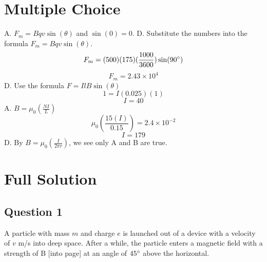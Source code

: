 \documentclass[letter,12pt]{exam}
\begin{document}
\begin{center}
\end{center}

\section{Multiple Choice}

\begin{questions}
	\question A. $F_m=Bqv\sin(\theta)$ and $\sin(0)=0$.
	\question D. Substitute the numbers into the formula $F_m=Bqv\sin(\theta)$.
		$$F_m=(500)(175)(\frac{1000}{3600})\sin(90 \degree)$$
		$$F_m=2.43\times10^4$$
	\question D. Use the formula $F=IlB\sin(\theta)$
		$$1=I(0.025)(1)$$
		$$I=40$$
	\question A. $B=\mu_0(\frac{NI}{L})$
		$$\mu_0(\frac{15(I)}{0.15})=2.4 \times 10^{-2}$$
		$$I=179$$
	\question D. By $B=\mu_0(\frac{I}{2\pi r})$, we see only A and B are true.
		
\end{questions}

\section{Full Solution}

\subsection{Question 1}

A particle with mass $m$ and charge $e$ is launched out of a device with a velocity of $v$ m/s into deep space. After a while, the particle enters a magnetic field with a strength of B [into page] at an angle of $45 \degree$ above the horizontal.
\end{document}
